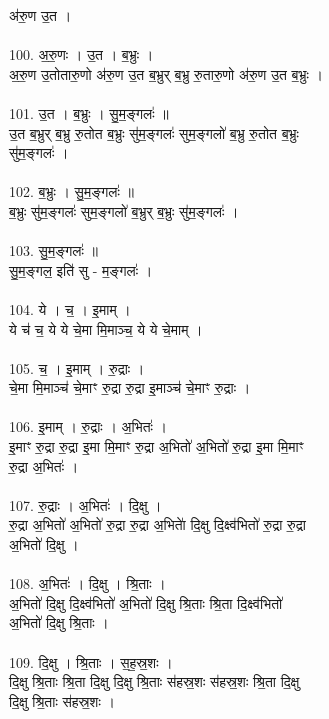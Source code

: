 अ॑रु॒ण उ॒त ।\\
\\
100. अ॒रु॒णः । उ॒त । ब॒भ्रुः ।\\
अ॒रु॒ण उ॒तोतारु॒णो अ॑रु॒ण उ॒त ब॒भ्रुर् ब॒भ्रु रु॒तारु॒णो अ॑रु॒ण उ॒त ब॒भ्रुः ।\\
\\
101. उ॒त । ब॒भ्रुः । सु॒म॒ङ्गलः॑ ॥\\
उ॒त ब॒भ्रुर् ब॒भ्रु रु॒तोत ब॒भ्रुः सु॑म॒ङ्गलः॑ सुम॒ङ्गलो॑ ब॒भ्रु रु॒तोत ब॒भ्रुः\\
सु॑म॒ङ्गलः॑ ।\\
\\
102. ब॒भ्रुः । सु॒म॒ङ्गलः॑ ॥\\
ब॒भ्रुः सु॑म॒ङ्गलः॑ सुम॒ङ्गलो॑ ब॒भ्रुर् ब॒भ्रुः सु॑म॒ङ्गलः॑ ।\\
\\
103. सु॒म॒ङ्गलः॑ ॥\\
सु॒म॒ङ्गल॒ इति॑ सु - म॒ङ्गलः॑ ।\\
\\
104. ये । च॒ । इ॒माम् ।\\
ये च॑ च॒ ये ये चे॒मा मि॒माञ्च॒ ये ये चे॒माम् ।\\
\\
105. च॒ । इ॒माम् । रु॒द्राः ।\\
चे॒मा मि॒माञ्च॑ चे॒माꣳ रु॒द्रा रु॒द्रा इ॒माञ्च॑ चे॒माꣳ रु॒द्राः ।\\
\\
106. इ॒माम् । रु॒द्राः । अ॒भितः॑ ।\\
इ॒माꣳ रु॒द्रा रु॒द्रा इ॒मा मि॒माꣳ रु॒द्रा अ॒भितो॑ अ॒भितो॑ रु॒द्रा इ॒मा मि॒माꣳ\\
रु॒द्रा अ॒भितः॑ ।\\
\\
107. रु॒द्राः । अ॒भितः॑ । दि॒क्षु ।\\
रु॒द्रा अ॒भितो॑ अ॒भितो॑ रु॒द्रा रु॒द्रा अ॒भिताे॑ दि॒क्षु दि॒क्ष्व॑भितो॑ रु॒द्रा रु॒द्रा\\
अ॒भितो॑ दि॒क्षु ।\\
\\
108. अ॒भितः॑ । दि॒क्षु । श्रि॒ताः ।\\
अ॒भितो॑ दि॒क्षु दि॒क्ष्व॑भितो॑ अ॒भितो॑ दि॒क्षु श्रि॒ताः श्रि॒ता दि॒क्ष्व॑भितो॑\\
अ॒भितो॑ दि॒क्षु श्रि॒ताः ।\\
\\
109. दि॒क्षु । श्रि॒ताः । स॒ह॒स्र॒शः ।\\
दि॒क्षु श्रि॒ताः श्रि॒ता दि॒क्षु दि॒क्षु श्रि॒ताः स॑हस्र॒शः स॑हस्र॒शः श्रि॒ता दि॒क्षु\\
दि॒क्षु श्रि॒ताः स॑हस्र॒शः ।\\
